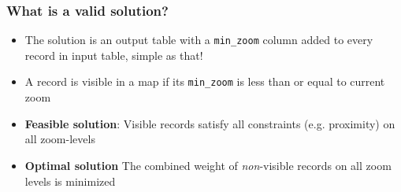 \documentclass{beamer}
\begin{document}
\frame
{
  \frametitle{What is a valid solution?}
  \begin{itemize}
  \item The solution is an output table with a \texttt{min\_zoom} column added to every record in input table, simple as that!
  \item A record is visible in a map if its \texttt{min\_zoom} is less than or equal to current zoom
  \item \textbf{Feasible solution}: Visible records satisfy all constraints (e.g. proximity) on all zoom-levels
  \item \textbf{Optimal solution} The combined weight of \emph{non}-visible records on all zoom levels is minimized
  \end{itemize}
  \begin{center}
  \end{center}
}
\end{document}

